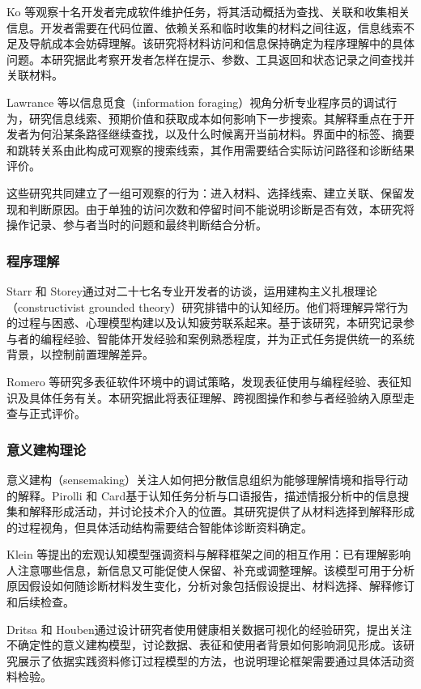 Ko 等\cite{ref14}观察十名开发者完成软件维护任务，将其活动概括为查找、关联和收集相关信息。开发者需要在代码位置、依赖关系和临时收集的材料之间往返，信息线索不足及导航成本会妨碍理解。该研究将材料访问和信息保持确定为程序理解中的具体问题。本研究据此考察开发者怎样在提示、参数、工具返回和状态记录之间查找并关联材料。

Lawrance 等\cite{ref08}以信息觅食（information foraging）视角分析专业程序员的调试行为，研究信息线索、预期价值和获取成本如何影响下一步搜索。其解释重点在于开发者为何沿某条路径继续查找，以及什么时候离开当前材料。界面中的标签、摘要和跳转关系由此构成可观察的搜索线索，其作用需要结合实际访问路径和诊断结果评价。

这些研究共同建立了一组可观察的行为：进入材料、选择线索、建立关联、保留发现和判断原因。由于单独的访问次数和停留时间不能说明诊断是否有效，本研究将操作记录、参与者当时的问题和最终判断结合分析。

\subsubsection{程序理解}

Starr 和 Storey\cite{ref16}通过对二十七名专业开发者的访谈，运用建构主义扎根理论（constructivist grounded theory）研究排错中的认知经历。他们将理解异常行为的过程与困惑、心理模型构建以及认知疲劳联系起来。基于该研究，本研究记录参与者的编程经验、智能体开发经验和案例熟悉程度，并为正式任务提供统一的系统背景，以控制前置理解差异。

Romero 等\cite{ref34}研究多表征软件环境中的调试策略，发现表征使用与编程经验、表征知识及具体任务有关。本研究据此将表征理解、跨视图操作和参与者经验纳入原型走查与正式评价。

\subsubsection{意义建构理论}

意义建构（sensemaking）关注人如何把分散信息组织为能够理解情境和指导行动的解释。Pirolli 和 Card\cite{ref17}基于认知任务分析与口语报告，描述情报分析中的信息搜集和解释形成活动，并讨论技术介入的位置。其研究提供了从材料选择到解释形成的过程视角，但具体活动结构需要结合智能体诊断资料确定。

Klein 等\cite{ref11}提出的宏观认知模型强调资料与解释框架之间的相互作用：已有理解影响人注意哪些信息，新信息又可能促使人保留、补充或调整理解。该模型可用于分析原因假设如何随诊断材料发生变化，分析对象包括假设提出、材料选择、解释修订和后续检查。

Dritsa 和 Houben\cite{ref57}通过设计研究者使用健康相关数据可视化的经验研究，提出关注不确定性的意义建构模型，讨论数据、表征和使用者背景如何影响洞见形成。该研究展示了依据实践资料修订过程模型的方法，也说明理论框架需要通过具体活动资料检验。

